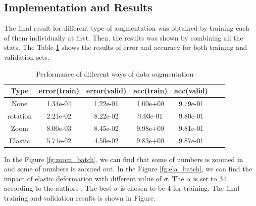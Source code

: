 \documentclass[11pt]{article}
\begin{document}
\subsection{Implementation and Results}
The final result for different type of augmentation was obtained by training each of them individually at first. Then, the results was shown by combining all the stats. The Table \ref{tb:aug} shows the results of error and accuracy for both training and validation sets.

\begin{table}[htp]
\begin{center}
\begin{tabular}{ c  c c c c  c c} 
\hline
Type &error(train) & error(valid) & acc(train) & acc(valid) \\
\hline
\hline
None & 1.34e-04 & 1.22e-01 & 1.00e+00 &9.79e-01 \\
 rotation	&2.21e-02 & 8.22e-02 & 9.93e-01 & 9.80e-01 \\ 
 Zoom  &8.00e-03 & 8.45e-02 & 9.98e+00 & 9.81e-01 \\ 
Elastic	 &5.71e-02 & 4.50e-02 & 9.83e+00 & 9.87e-01 \\ 
\end{tabular}
\caption{Performance of different ways of data augmentation}
\label{tb:aug}
\end{center}	
\end{table}






In the Figure \ref{fg:zoom_batch}, we can find that some of numbers is zoomed in and some of numbers is zoomed out. 
In the Figure \ref{fg:ela_batch}, we can find the impact of elastic deformation with different value of $\sigma$. The $\alpha$ is set to $34$ according to the authors \cite{Elastic}. The best $\sigma$ is chosen to be $4$ for training. The final training and validation results is shown in Figure.
\end{document}
